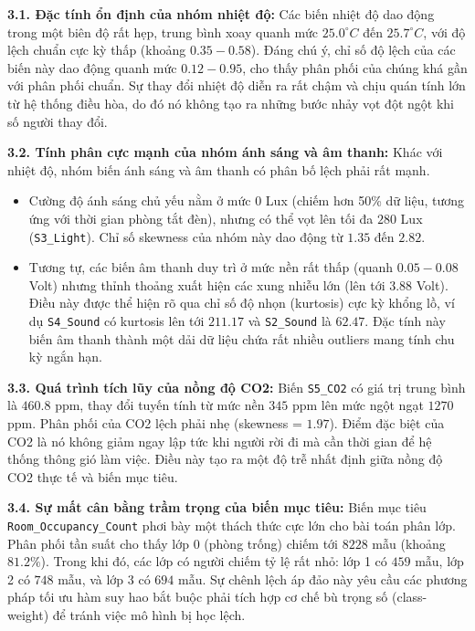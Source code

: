 \textbf{3.1. Đặc tính ổn định của nhóm nhiệt độ:}
Các biến nhiệt độ dao động trong một biên độ rất hẹp, trung bình xoay quanh mức $25.0^\circ C$ đến $25.7^\circ C$, với độ lệch chuẩn cực kỳ thấp (khoảng $0.35 - 0.58$). Đáng chú ý, chỉ số độ lệch của các biến này dao động quanh mức $0.12 - 0.95$, cho thấy phân phối của chúng khá gần với phân phối chuẩn. Sự thay đổi nhiệt độ diễn ra rất chậm và chịu quán tính lớn từ hệ thống điều hòa, do đó nó không tạo ra những bước nhảy vọt đột ngột khi số người thay đổi.

\textbf{3.2. Tính phân cực mạnh của nhóm ánh sáng và âm thanh:}
Khác với nhiệt độ, nhóm biến ánh sáng và âm thanh có phân bố lệch phải rất mạnh. 
\begin{itemize}
    \item Cường độ ánh sáng chủ yếu nằm ở mức $0$ Lux (chiếm hơn 50\% dữ liệu, tương ứng với thời gian phòng tắt đèn), nhưng có thể vọt lên tối đa $280$ Lux (\texttt{S3\_Light}). Chỉ số skewness của nhóm này dao động từ $1.35$ đến $2.82$.
    \item Tương tự, các biến âm thanh duy trì ở mức nền rất thấp (quanh $0.05 - 0.08$ Volt) nhưng thỉnh thoảng xuất hiện các xung nhiễu lớn (lên tới $3.88$ Volt). Điều này được thể hiện rõ qua chỉ số độ nhọn (kurtosis) cực kỳ khổng lồ, ví dụ \texttt{S4\_Sound} có kurtosis lên tới $211.17$ và \texttt{S2\_Sound} là $62.47$. Đặc tính này biến âm thanh thành một dải dữ liệu chứa rất nhiều outliers mang tính chu kỳ ngắn hạn.
\end{itemize}

\textbf{3.3. Quá trình tích lũy của nồng độ CO2:}
Biến \texttt{S5\_CO2} có giá trị trung bình là $460.8$ ppm, thay đổi tuyến tính từ mức nền $345$ ppm lên mức ngột ngạt $1270$ ppm. Phân phối của CO2 lệch phải nhẹ (skewness = $1.97$). Điểm đặc biệt của CO2 là nó không giảm ngay lập tức khi người rời đi mà cần thời gian để hệ thống thông gió làm việc. Điều này tạo ra một độ trễ nhất định giữa nồng độ CO2 thực tế và biến mục tiêu.

\textbf{3.4. Sự mất cân bằng trầm trọng của biến mục tiêu:}
Biến mục tiêu \texttt{Room\_Occupancy\_Count} phơi bày một thách thức cực lớn cho bài toán phân lớp. Phân phối tần suất cho thấy lớp 0 (phòng trống) chiếm tới $8228$ mẫu (khoảng $81.2\%$). Trong khi đó, các lớp có người chiếm tỷ lệ rất nhỏ: lớp 1 có $459$ mẫu, lớp 2 có $748$ mẫu, và lớp 3 có $694$ mẫu. Sự chênh lệch áp đảo này yêu cầu các phương pháp tối ưu hàm suy hao bắt buộc phải tích hợp cơ chế bù trọng số (class-weight) để tránh việc mô hình bị học lệch.

